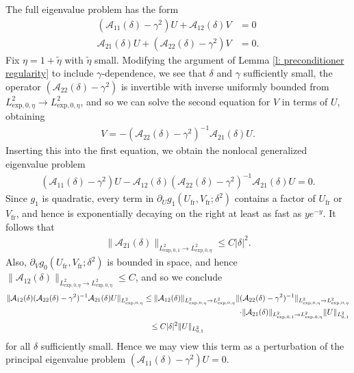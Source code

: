 \documentclass[11pt]{article}
\numberwithin{equation}{section}
\numberwithin{prop}{section}
\begin{document}
The full eigenvalue problem has the form
\begin{align}
	(\mathcal{A}_{11}(\delta) - \gamma^2) U + \mathcal{A}_{12}(\delta) V &= 0 \\
	\mathcal{A}_{21}(\delta) U + (\mathcal{A}_{22}(\delta) - \gamma^2) V&=0.
\end{align}
Fix $\eta = 1 + \tilde{\eta}$ with $\tilde{\eta}$ small. Modifying the argument of Lemma \ref{l: preconditioner regularity} to include $\gamma$-dependence, we see that $\delta$ and $\gamma$ sufficiently small, the operator $(\mathcal{A}_{22}(\delta) - \gamma^2)$ is invertible with inverse uniformly bounded from $L^2_{\mathrm{exp}, 0, \eta} \to L^2_{\mathrm{exp}, 0, \eta}$, and so we can solve the second equation for $V$ in terms of $U$, obtaining
\begin{align}
	V = - (\mathcal{A}_{22}(\delta) - \gamma^2)^{-1} \mathcal{A}_{21}(\delta) U. 
\end{align}
Inserting this into the first equation, we obtain the nonlocal generalized eigenvalue problem
\begin{align}
	(\mathcal{A}_{11}(\delta) - \gamma^2) U - \mathcal{A}_{12}(\delta) (\mathcal{A}_{22}(\delta) - \gamma^2)^{-1} \mathcal{A}_{21}(\delta) U = 0. \label{e: transcrit U eigenvalue problem} 
\end{align}
Since $g_1$ is quadratic, every term in $\partial_U g_1 (U_\mathrm{fr}, V_\mathrm{fr}; \delta^2)$ contains a factor of $U_\mathrm{fr}$ or $V_\mathrm{fr}$, and hence is exponentially decaying on the right at least as fast as $ye^{-y}$. It follows that
\begin{align}
	\| \mathcal{A}_{21}(\delta) \|_{L^2_{\mathrm{exp}, 0, 1} \to L^2_{\mathrm{exp}, 0, \eta}} \leq C |\delta|^2. \label{e: transcrit A21 estimate}
\end{align} 
Also, $\partial_V g_0 (U_\mathrm{fr}, V_\mathrm{fr}; \delta^2)$ is bounded in space, and hence $\| \mathcal{A}_{12}(\delta) \|_{L^2_{\mathrm{exp}, 0, \eta} \to L^2_{\mathrm{exp}, 0, \eta}} \leq C$, and so we conclude
\begin{multline*}
	\|  \mathcal{A}_{12}(\delta) (\mathcal{A}_{22}(\delta) - \gamma^2)^{-1} \mathcal{A}_{21}(\delta) U \|_{L^2_{\mathrm{exp}, 0, \eta}} \leq \| \mathcal{A}_{12}(\delta)\|_{L^2_{\mathrm{exp}, 0, \eta} \to L^2_{\mathrm{exp}, 0, \eta}} \| (\mathcal{A}_{22}(\delta) - \gamma^2)^{-1} \|_{L^2_{\mathrm{exp}, 0, \eta} \to L^2_{\mathrm{exp}, 0, \eta}} \\
	\hfill \cdot \| \mathcal{A}_{21}(\delta) \|_{L^2_{\mathrm{exp}, 0, 1} \to L^2_{\mathrm{exp}, 0, \eta}} \| U \|_{L^2_{0,1}} \\
	\leq C |\delta|^2 \| U \|_{L^2_{0, 1}}
\end{multline*}
for all $\delta$ sufficiently small. Hence we may view this term as a perturbation of the principal eigenvalue problem $(\mathcal{A}_{11}(\delta) - \gamma^2) U = 0$. 
\end{document}
